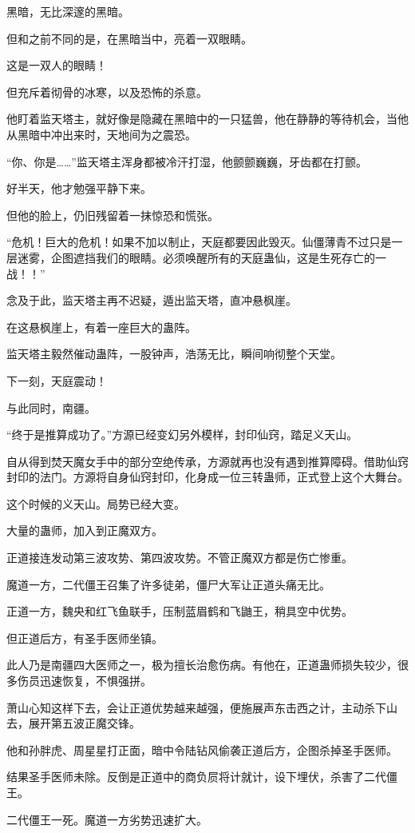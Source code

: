 \begin{this_body}
黑暗，无比深邃的黑暗。

但和之前不同的是，在黑暗当中，亮着一双眼睛。

这是一双人的眼睛！

但充斥着彻骨的冰寒，以及恐怖的杀意。

他盯着监天塔主，就好像是隐藏在黑暗中的一只猛兽，他在静静的等待机会，当他从黑暗中冲出来时，天地间为之震恐。

“你、你是……”监天塔主浑身都被冷汗打湿，他颤颤巍巍，牙齿都在打颤。

好半天，他才勉强平静下来。

但他的脸上，仍旧残留着一抹惊恐和慌张。

“危机！巨大的危机！如果不加以制止，天庭都要因此毁灭。仙僵薄青不过只是一层迷雾，企图遮挡我们的眼睛。必须唤醒所有的天庭蛊仙，这是生死存亡的一战！！”

念及于此，监天塔主再不迟疑，遁出监天塔，直冲悬枫崖。

在这悬枫崖上，有着一座巨大的蛊阵。

监天塔主毅然催动蛊阵，一股钟声，浩荡无比，瞬间响彻整个天堂。

下一刻，天庭震动！

与此同时，南疆。

“终于是推算成功了。”方源已经变幻另外模样，封印仙窍，踏足义天山。

自从得到焚天魔女手中的部分空绝传承，方源就再也没有遇到推算障碍。借助仙窍封印的法门。方源将自身仙窍封印，化身成一位三转蛊师，正式登上这个大舞台。

这个时候的义天山。局势已经大变。

大量的蛊师，加入到正魔双方。

正道接连发动第三波攻势、第四波攻势。不管正魔双方都是伤亡惨重。

魔道一方，二代僵王召集了许多徒弟，僵尸大军让正道头痛无比。

正道一方，魏央和红飞鱼联手，压制蓝眉鹤和飞鼬王，稍具空中优势。

但正道后方，有圣手医师坐镇。

此人乃是南疆四大医师之一，极为擅长治愈伤病。有他在，正道蛊师损失较少，很多伤员迅速恢复，不惧强拼。

萧山心知这样下去，会让正道优势越来越强，便施展声东击西之计，主动杀下山去，展开第五波正魔交锋。

他和孙胖虎、周星星打正面，暗中令陆钻风偷袭正道后方，企图杀掉圣手医师。

结果圣手医师未除。反倒是正道中的商负屃将计就计，设下埋伏，杀害了二代僵王。

二代僵王一死。魔道一方劣势迅速扩大。


\end{this_body}
